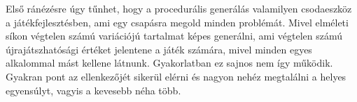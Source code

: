 Első ránézésre úgy tűnhet, hogy a procedurális generálás valamilyen csodaeszköz a játékfejlesztésben, ami egy csapásra megold minden problémát. Mivel elméleti síkon végtelen számú variációjú tartalmat képes generálni, ami végtelen számú újrajátszhatósági értéket jelentene a játék számára, mivel minden egyes alkalommal mást kellene látnunk. Gyakorlatban ez sajnos nem így működik. Gyakran pont az ellenkezőjét sikerül elérni és nagyon nehéz megtalálni a helyes egyensúlyt, vagyis a kevesebb néha több.

